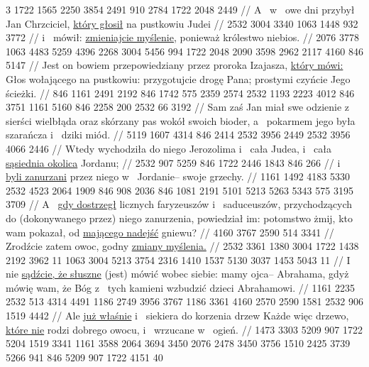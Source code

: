 \begingl
\lettrine[loversize=1,lraise=-1.3]{3 }{}%
 1722 1565 2250 3854 2491 910 2784 1722 2048 2449
//
\glb
 A~ w~ owe dni przybył Jan Chrzciciel, \underline{który głosił} na pustkowiu Judei
//
\endgl
\begingl
\gla
{} 2532 3004 3340 1063 1448 932 3772
//
\glb
{} i~ mówił: \underline{zmieniajcie myślenie,} ponieważ  królestwo niebios.
//
\endgl
\begingl
\gla
{} 2076 3778 1063 4483 5259 4396 2268 3004 5456 994 1722 2048 2090 3598 2962 2117 4160 846 5147
//
\glb
{} Jest on bowiem przepowiedziany przez proroka Izajasza, \underline{który mówi:} Głos wołającego na pustkowiu: przygotujcie drogę Pana; prostymi czyńcie Jego ścieżki.
//
\endgl
\begingl
\gla
{} 846 1161 2491 2192 846 1742 575 2359 2574 2532 1193 2223 4012 846 3751 1161 5160 846 2258 200 2532 66 3192
//
\glb
{} Sam zaś Jan miał swe odzienie z~ sierści wielbłąda oraz skórzany pas wokół swoich bioder, a~ pokarmem jego była szarańcza i~ dziki miód.
//
\endgl
\begingl
\gla
{} 5119 1607 4314 846 2414 2532 3956 2449 2532 3956 4066 2446
//
\glb
{} Wtedy wychodziła do niego Jerozolima i~ cała Judea, i~ cała \underline{sąsiednia okolica} Jordanu;
//
\endgl
\begingl
\gla
{} 2532 907 5259 846 1722 2446 1843 846 266
//
\glb
{} i~ \underline{byli zanurzani} przez niego w~ Jordanie–  swoje grzechy.
//
\endgl
\begingl
\gla
{} 1161 1492 4183 5330 2532 4523 2064 1909 {} 846 908 2036 846 1081 2191 5101 5213 5263 5343 575 3195 3709
//
\glb
{} A~ \underline{gdy dostrzegł} licznych faryzeuszów i~ saduceuszów, przychodzących do (dokonywanego przez) niego zanurzenia, powiedział im: potomstwo żmij, kto wam pokazał,  od \underline{mającego nadejść} gniewu?
//
\endgl
\begingl
\gla
{} 4160 3767 2590 514 3341
//
\glb
{} Zrodźcie zatem owoc, godny \underline{zmiany myślenia.}
//
\endgl
\begingl
\gla
{} 2532 3361 1380 {} 3004 1722 1438 2192 3962 11 1063 3004 5213 3754 2316 1410 1537 5130 3037 1453 5043 11
//
\glb
{} I~ nie \underline{sądźcie, że słuszne} (jest) mówić wobec siebie: mamy ojca– Abrahama, gdyż mówię wam, że Bóg  z~ tych kamieni wzbudzić dzieci Abrahamowi.
//
\endgl
\begingl
\gla
{} 1161 2235 2532 513 4314 4491 1186 2749 3956 3767 1186 3361 4160 2570 2590 1581 2532 906 1519 4442
//
\glb
{} Ale \underline{już właśnie} i~ siekiera do korzenia drzew  Każde więc drzewo, \underline{które nie} rodzi dobrego owocu,  i~ wrzucane w~ ogień.
//
\endgl
\begingl
\gla
{} 1473 3303 5209 907 1722 5204 1519 3341 1161 3588 2064 3694 3450 2076 2478 3450 3756 1510 2425 {} 3739 5266 941 846 5209 907 1722 4151 40
